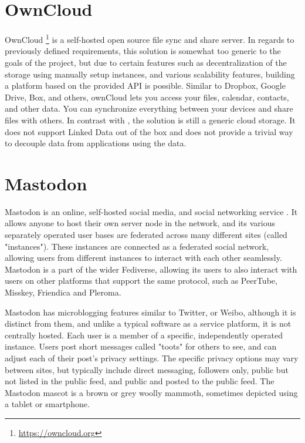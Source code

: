 \section{OwnCloud}

OwnCloud \footnote{\url{https://owncloud.org}} is a self-hosted open source file sync and share server. In regards to previously defined requirements, this solution is somewhat too generic to the goals of the project, but due to certain features such as decentralization of the storage using manually setup instances, and various scalability features, building a platform based on the provided API is possible. Similar to Dropbox, Google Drive, Box, and others, ownCloud lets you access your files, calendar, contacts, and other data. You can synchronize everything between your devices and share files with others. In contrast with \solid{}, the solution is still a generic cloud storage. It does not support Linked Data out of the box and does not provide a trivial way to decouple data from applications using the data. 

\section{Mastodon}

Mastodon is an online, self-hosted social media, and social networking service \cite{mastodon}. It allows anyone to host their own server node in the network, and its various separately operated user bases are federated across many different sites (called "instances"). These instances are connected as a federated social network, allowing users from different instances to interact with each other seamlessly. Mastodon is a part of the wider Fediverse, allowing its users to also interact with users on other platforms that support the same protocol, such as PeerTube, Misskey, Friendica and Pleroma.

Mastodon has microblogging features similar to Twitter, or Weibo, although it is distinct from them, and unlike a typical software as a service platform, it is not centrally hosted. Each user is a member of a specific, independently operated instance. Users post short messages called "toots" for others to see, and can adjust each of their post's privacy settings. The specific privacy options may vary between sites, but typically include direct messaging, followers only, public but not listed in the public feed, and public and posted to the public feed. The Mastodon mascot is a brown or grey woolly mammoth, sometimes depicted using a tablet or smartphone.

